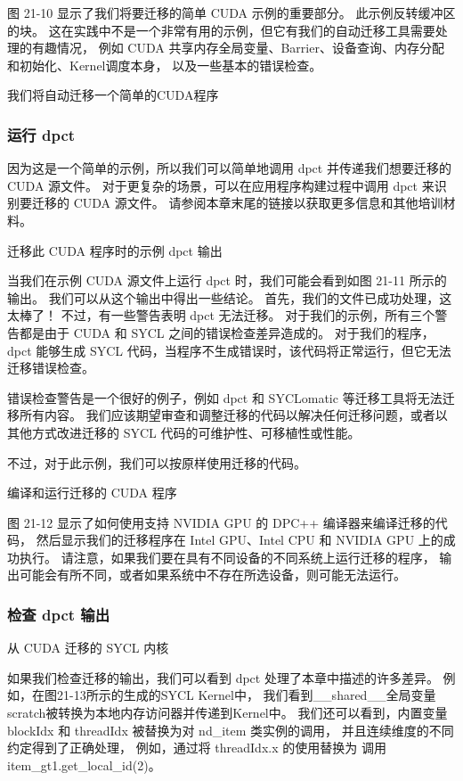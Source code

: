 图 21-10 显示了我们将要迁移的简单 CUDA 示例的重要部分。 此示例反转缓冲区的块。 
这在实践中不是一个非常有用的示例，但它有我们的自动迁移工具需要处理的有趣情况，
例如 CUDA 共享内存全局变量、Barrier、设备查询、内存分配和初始化、Kernel调度本身， 以及一些基本的错误检查。

{\color{red} 我们将自动迁移一个简单的CUDA程序}

\subsubsection{运行 dpct}

因为这是一个简单的示例，所以我们可以简单地调用 dpct 并传递我们想要迁移的 CUDA 源文件。 
对于更复杂的场景，可以在应用程序构建过程中调用 dpct 来识别要迁移的 CUDA 源文件。 
请参阅本章末尾的链接以获取更多信息和其他培训材料。

{\color{red} 迁移此 CUDA 程序时的示例 dpct 输出}

当我们在示例 CUDA 源文件上运行 dpct 时，我们可能会看到如图 21-11 所示的输出。 
我们可以从这个输出中得出一些结论。 首先，我们的文件已成功处理，这太棒了！ 不过，有一些警告表明 dpct 无法迁移。 
对于我们的示例，所有三个警告都是由于 CUDA 和 SYCL 之间的错误检查差异造成的。 
对于我们的程序，dpct 能够生成 SYCL 代码，当程序不生成错误时，该代码将正常运行，但它无法迁移错误检查。

错误检查警告是一个很好的例子，例如 dpct 和 SYCLomatic 等迁移工具将无法迁移所有内容。 
我们应该期望审查和调整迁移的代码以解决任何迁移问题，或者以其他方式改进迁移的 SYCL 代码的可维护性、可移植性或性能。

不过，对于此示例，我们可以按原样使用迁移的代码。

{\color{red} 编译和运行迁移的 CUDA 程序}

图 21-12 显示了如何使用支持 NVIDIA GPU 的 DPC++ 编译器来编译迁移的代码，
然后显示我们的迁移程序在 Intel GPU、Intel CPU 和 NVIDIA GPU 上的成功执行。 
请注意，如果我们要在具有不同设备的不同系统上运行迁移的程序，
输出可能会有所不同，或者如果系统中不存在所选设备，则可能无法运行。

\subsubsection{检查 dpct 输出}

{\color{red} 从 CUDA 迁移的 SYCL 内核}

如果我们检查迁移的输出，我们可以看到 dpct 处理了本章中描述的许多差异。 
例如，在图21-13所示的生成的SYCL Kernel中，
我们看到\_\_shared\_\_全局变量scratch被转换为本地内存访问器并传递到Kernel中。 
我们还可以看到，内置变量 blockIdx 和 threadIdx 被替换为对 nd\_item 类实例的调用，
并且连续维度的不同约定得到了正确处理，
例如，通过将 threadIdx.x 的使用替换为 调用 item\_gt1.get\_local\_id(2)。

